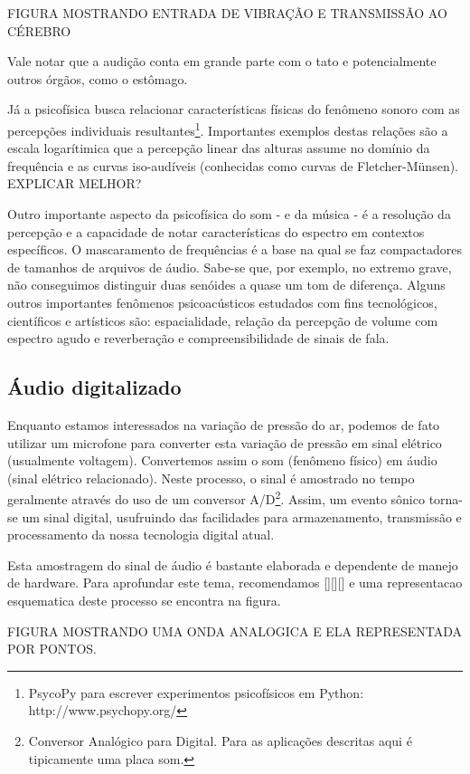 FIGURA MOSTRANDO ENTRADA DE VIBRAÇÃO E TRANSMISSÃO AO CÉREBRO

Vale notar que a audição conta em grande parte com o tato e potencialmente
outros órgãos, como o estômago.

Já a psicofísica busca relacionar características físicas do fenômeno sonoro
com as percepções individuais resultantes\footnote{PsycoPy para escrever experimentos psicofísicos em Python: http://www.psychopy.org/}.
Importantes exemplos destas relações
são a escala logarítimica que a percepção linear das alturas assume no
domínio da frequência e as curvas iso-audíveis (conhecidas como curvas de Fletcher-Münsen).
EXPLICAR MELHOR?

Outro importante aspecto da psicofísica do som - e da música - é a resolução da percepção
e a capacidade de notar características do espectro em contextos específicos. O mascaramento
de frequências é a base na qual se faz compactadores de tamanhos de arquivos de áudio. Sabe-se
que, por exemplo, no extremo grave, não conseguimos distinguir duas senóides a quase um tom de
diferença. Alguns outros importantes fenômenos psicoacústicos estudados com fins tecnológicos, científicos e artísticos são: espacialidade,
relação da percepção de volume com espectro agudo e reverberação e compreensibilidade de sinais de fala.


\subsection{Áudio digitalizado}
Enquanto estamos interessados na variação de pressão do ar, podemos de fato utilizar
um microfone para converter esta variação de pressão em sinal elétrico (usualmente voltagem).
Convertemos assim o som (fenômeno físico) em áudio (sinal elétrico relacionado).
Neste processo, o sinal é amostrado no tempo geralmente através do uso de
um conversor A/D\footnote{Conversor Analógico para Digital. Para as aplicações descritas aqui é tipicamente uma placa som.}. Assim, um evento sônico
torna-se um sinal digital, usufruindo das facilidades para armazenamento, transmissão e
processamento da nossa tecnologia digital atual.

Esta amostragem do sinal de áudio é bastante elaborada e dependente de manejo de hardware. Para
aprofundar este tema, recomendamos [][][] e uma representacao esquematica deste processo
se encontra na figura.	 

FIGURA MOSTRANDO UMA ONDA ANALOGICA E ELA REPRESENTADA POR PONTOS.

